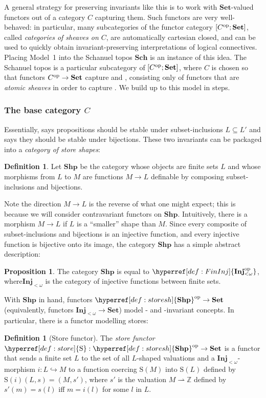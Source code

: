 \documentclass[
  sigconf,
  screen, ]{acmart}
\makeatletter
\theoremstyle{definition}
\newtheorem{definition}[theorem]{Definition}
\newtheorem{proposition}[theorem]{Proposition}
\newcommand\Z{\mathbb Z}
\newcommand{\labelword}[2]{\phantomsection
  #1\def\@currentlabel{\unexpanded{#1}}\label{#2}}
\newcommand\nref[2]{\hyperref[#1]{#2}} \newcommand\checkhigh{{\huge{\color{red}\textbf{TODO: check}}}}
\newcommand\funcat[2]{[#1;#2]}
\newcommand\FinInj{{\nref{def:FinInj}{\mathbf{Inj}_{<\omega}}}}
\newcommand\FinInjop{{\nref{def:FinInj}{\mathbf{Inj}_{<\omega}\op}}}
\newcommand\op{^{\rm op}}
\newcommand\Set{\mathbf{Set}}
\newcommand\Store{{\nref{def:store}{\mathrm{S}}}}
\newcommand\Sch{{\nref{def:Sch}{\mathbf{Sch}}}}
\makeatother
\begin{document}
A general strategy for preserving
invariants like this is to work with $\Set$-valued functors out of a
category $C$ capturing them.
Such functors are very well-behaved:
in particular, many subcategories of the
functor category $\funcat{C\op}{\Set}$,
called \emph{categories of sheaves on $C$},
are automatically cartesian closed, and
can be used to quickly obtain
invariant-preserving interpretations of logical connectives.
Placing Model~1 into the Schanuel topos $\Sch$
is an instance of this idea.
The Schanuel topos is a particular subcategory of $\funcat{C\op}\Set$,
where $C$ is chosen so that functors $C\op\to\Set$
capture \Extension{} and \Renaming{},
consisting only of functors that are \emph{atomic sheaves} in order to capture \Restriction{}.
We build up to this model in steps.

\subsubsection{The base category $C$} \label{sec:nominal-fixing-base-category}
Essentially, \Extension{} says propositions should be stable under
subset-inclusions $L\subseteq L'$
and \Renaming{} says they should be stable under
bijections.
These two invariants
can be packaged into a \emph{category of store shapes}:
\newcommand\StoreSh{{\nref{def:storesh}{\mathbf{Shp}}}}
\begin{definition} \label{def:storesh}
  Let $\StoreSh$ be the category whose objects
  are finite sets $L$ and whose morphisms from $L$
  to $M$ are functions $M\to L$
  definable by composing subset-inclusions and bijections.
\end{definition}
Note the direction $M\to L$ is the reverse of what one
might expect; this is because we will consider contravariant functors
on $\StoreSh$.
Intuitively, there is a morphism $M \to L$ if $L$ is a ``smaller'' shape
than $M$.
Since every composite of subset-inclusions and bijections
is an injective function, and every injective function
is bijective onto its image,
the category $\StoreSh$ has a simple abstract description:
\begin{proposition}
  The category $\StoreSh$
  is equal to $\FinInjop$,
  \labelword{where}{def:FinInj} $\FinInj$ is the category of
  injective functions between finite sets.
\end{proposition}
With $\StoreSh$ in hand,
functors $\StoreSh\op\to\Set$ (equivalently,
functors $\FinInj\to\Set$) model
\Extension{}- and \Renaming{}-invariant concepts.
In particular, there is a functor
modelling stores:
\begin{definition}[Store functor] \label{def:store}
  The \emph{store functor} $\Store : \StoreSh\op\to\Set$ is a 
  functor that sends a finite set
  $L$ to the set of 
  all $L$-shaped valuations
  and a 
  $\FinInj$-morphism $i : L\hookrightarrow M$ 
  to a function coercing $\Store(M)$ into $\Store(L)$
  defined by
  $\Store(i)(L,s) = (M,s')$, where
  $s'$ is the valuation $M\rightharpoonup\Z$
  defined by $s'(m) = s(l)$ iff $m = i(l)$ for some $l$ in $L$.
\end{definition}
\end{document}
